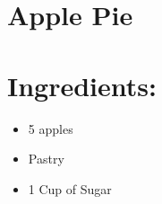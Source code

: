 \section{Apple Pie}
\section{Ingredients:}
\begin{itemize}
\item 5 apples
\item Pastry
\item 1 Cup of Sugar
\end{itemize}

